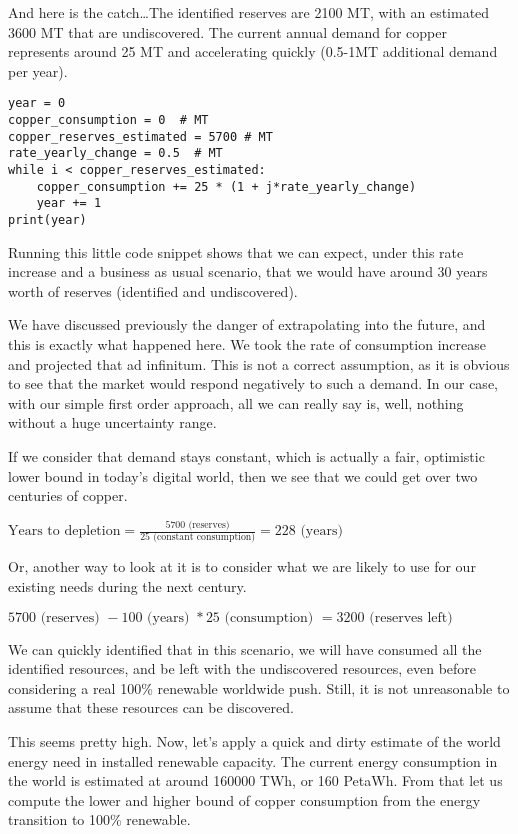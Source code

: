 And here is the catch\ldots The identified reserves are 2100 MT, with an estimated 3600 MT that are undiscovered. The current annual demand for copper represents around 25 MT and accelerating quickly (0.5-1MT additional demand per year). 

\begin{lstlisting}[caption={An example of an incorrect interpolation.}]
year = 0
copper_consumption = 0  # MT
copper_reserves_estimated = 5700 # MT
rate_yearly_change = 0.5  # MT
while i < copper_reserves_estimated:
    copper_consumption += 25 * (1 + j*rate_yearly_change)
    year += 1
print(year)
\end{lstlisting}

Running this little code snippet shows that we can expect, under this rate increase and a business as usual scenario, that we would have around 30 years worth of reserves (identified and undiscovered).

We have discussed previously the danger of extrapolating into the future, and this is exactly what happened here. We took the rate of consumption increase and projected that ad infinitum. This is not a correct assumption, as it is obvious to see that the market would respond negatively to such a demand. In our case, with our simple first order approach, all we can really say is, well, nothing without a huge uncertainty range.

If we consider that demand stays constant, which is actually a fair, optimistic lower bound in today's digital world, then we see that we could get over two centuries of copper.

$\textrm{Years to depletion} = \frac{5700 \textrm{ (reserves)}}{25 \textrm{ (constant consumption)}} = 228 \textrm{ (years)}$

Or, another way to look at it is to consider what we are likely to use for our existing needs during the next century.

$5700\textrm{ (reserves) } - 100\textrm{ (years) } * 25\textrm{ (consumption) } = 3200\textrm{ (reserves left)}$

We can quickly identified that in this scenario, we will have consumed all the identified resources, and be left with the undiscovered resources, even before considering a real 100\% renewable worldwide push. Still, it is not unreasonable to assume that these resources can be discovered.

This seems pretty high. Now, let's apply a quick and dirty estimate of the world energy need in installed renewable capacity. The current energy consumption in the world is estimated at around 160000 TWh, or 160 PetaWh. From that let us compute the lower and higher bound of copper consumption from the energy transition to 100\% renewable.

